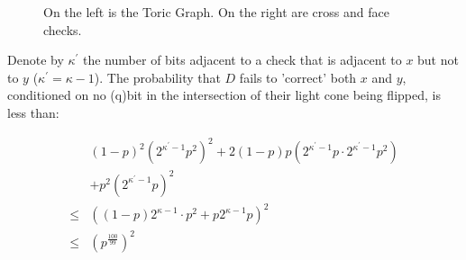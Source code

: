 \documentclass{beamer}
\begin{document}
\begin{frame}

    \begin{figure}[H]
\caption{On the left is the Toric Graph. On the right are cross and face checks.}
\label{fig:Toric}
\end{figure}

\end{frame}

\begin{frame}
  Denote by $\kappa^{\prime}$ the number of bits adjacent to a check that is adjacent to $x$ but not to $y$ ($\kappa^{\prime} = \kappa -1$). The probability that $D$ fails to 'correct' both $x$ and $y$, conditioned on no (q)bit in the intersection of their light cone being flipped, is less than:

\begin{equation*}
  \begin{split}
    &(1-p)^{2} \left(2^{\kappa^{\prime}-1}p^{2}\right)^{2} + 2(1-p)p \left( 2^{\kappa^{\prime}-1} p \cdot 2^{\kappa^{\prime}-1} p^{2}  \right) \\
    & + p^{2}\left( 2^{\kappa^{\prime}-1} p \right)^{2} \\ 
    \le & \left( (1-p)2^{\kappa - 1} \cdot p^{2} + p 2^{\kappa-1} p \right)^{2} \\
    \le & \left( p^{\frac{100}{99}} \right)^{2}
  \end{split}
\end{equation*}
\end{frame}
\end{document}
